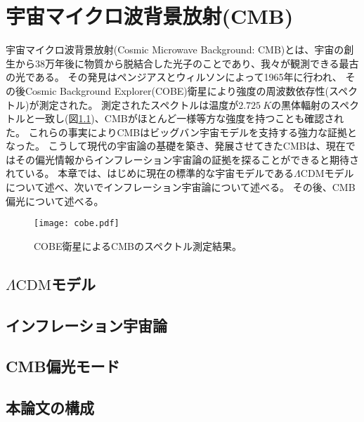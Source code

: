 \documentclass[../../main.tex]{subfiles}
\begin{document}
\chapter{宇宙マイクロ波背景放射(CMB)}
宇宙マイクロ波背景放射(Cosmic Microwave Background: CMB)とは、宇宙の創生から38万年後に物質から脱結合した光子のことであり、我々が観測できる最古の光である。
その発見はペンジアスとウィルソンによって1965年に行われ\cite{1965ApJ...142..419P}、
その後Cosmic Background Explorer(COBE)衛星により強度の周波数依存性(スペクトル)が測定された\cite{1996ApJ...473..576F}。
測定されたスペクトルは温度が$\SI{2.725}{K}$の黒体輻射のスペクトルと一致し(図\ref{fig:cobe})、CMBがほとんど一様等方な強度を持つことも確認された。
これらの事実によりCMBはビッグバン宇宙モデルを支持する強力な証拠となった。
こうして現代の宇宙論の基礎を築き、発展させてきたCMBは、現在ではその偏光情報からインフレーション宇宙論の証拠を探ることができると期待されている。
本章では、はじめに現在の標準的な宇宙モデルである$\Lambda\mathrm{CDM}$モデルについて述べ、次いでインフレーション宇宙論について述べる。
その後、CMB偏光について述べる。
\begin{figure}[H]
    \centering
    \texttt{[image: cobe.pdf]}
    \caption{COBE衛星によるCMBのスペクトル測定結果。}
    \label{fig:cobe}
\end{figure}

\section{$\Lambda\mathrm{CDM}$モデル}

\section{インフレーション宇宙論}

\section{CMB偏光モード}
\section{本論文の構成}
\end{document}
